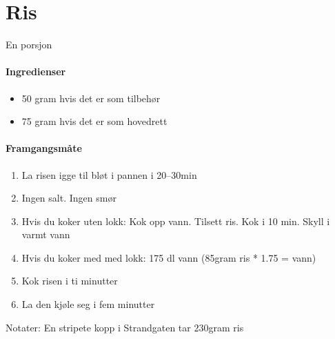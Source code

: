 \section{﻿Ris}
\label{ris}
En porsjon

\paragraph{Ingredienser}
\begin{itemize}[noitemsep]
	\item 50 gram hvis det er som tilbehør
	\item 75 gram hvis det er som hovedrett
\end{itemize}

\paragraph{Framgangsmåte}
\begin{enumerate}[noitemsep]
	\item La risen igge til bløt i pannen i 20--30min
	\item Ingen salt. Ingen smør
	\item Hvis du koker uten lokk: Kok opp vann. Tilsett ris. Kok i 10 min. Skyll i varmt vann
	\item Hvis du koker med med lokk: 175 dl vann (85gram ris * 1.75 = vann)
	\item Kok risen i ti minutter
	\item La den kjøle seg i fem minutter
\end{enumerate}

Notater: En stripete kopp i Strandgaten tar 230gram ris
